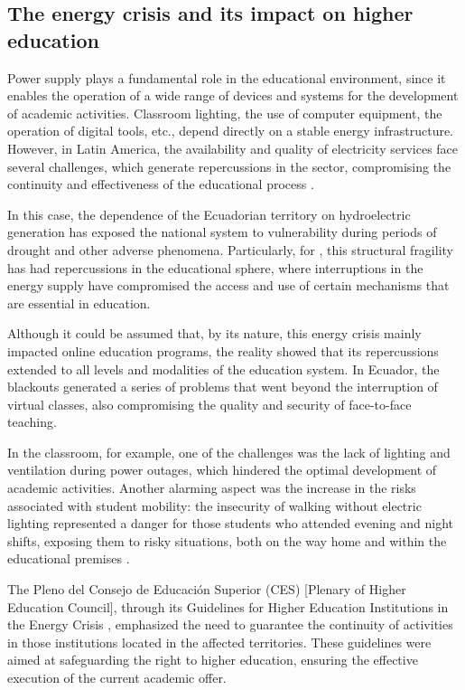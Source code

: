 \documentclass[english]{textolivre}
\begin{document}
\subsection{The energy crisis and its impact on higher education}\label{sec-normas}
Power supply plays a fundamental role in the educational environment, since it enables the operation of a wide range of devices and systems for the development of academic activities. Classroom lighting, the use of computer equipment, the operation of digital tools, etc., depend directly on a stable energy infrastructure. However, in Latin America, the availability and quality of electricity services face several challenges, which generate repercussions in the sector, compromising the continuity and effectiveness of the educational process \cite{industronic2024ups}.

In this case, the dependence of the Ecuadorian territory on hydroelectric generation has exposed the national system to vulnerability during periods of drought and other adverse phenomena. Particularly, for \textcite{moran2024problematica}, this structural fragility has had repercussions in the educational sphere, where interruptions in the energy supply have compromised the access and use of certain mechanisms that are essential in education.

Although it could be assumed that, by its nature, this energy crisis mainly impacted online education programs, the reality showed that its repercussions extended to all levels and modalities of the education system. In Ecuador, the blackouts generated a series of problems that went beyond the interruption of virtual classes, also compromising the quality and security of face-to-face teaching.

In the classroom, for example, one of the challenges was the lack of lighting and ventilation during power outages, which hindered the optimal development of academic activities. Another alarming aspect was the increase in the risks associated with student mobility: the insecurity of walking without electric lighting represented a danger for those students who attended evening and night shifts, exposing them to risky situations, both on the way home and within the educational premises \cite{eluniverso2024apagones}.

The Pleno del Consejo de Educación Superior (CES) [Plenary of Higher Education Council], through its Guidelines for Higher Education Institutions in the Energy Crisis \cite{ces2024lineamientos}, emphasized the need to guarantee the continuity of activities in those institutions located in the affected territories. These guidelines were aimed at safeguarding the right to higher education, ensuring the effective execution of the current academic offer.
\end{document}
